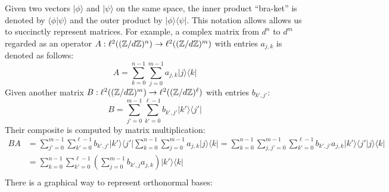 Given two vectors $|\phi \rangle$ and $| \psi \rangle$ on the same space, the inner product ``bra-ket'' is denoted by $\langle \phi | \psi \rangle$ and the outer product by $|\phi \rangle\langle \psi|$. 
This notation allows allows us to succinctly represent matrices.  For example, a complex matrix from $d^n$ to $d^m$ regarded as an operator $A:\ell^2((\mathbb{Z}/d\mathbb{Z})^n)\to \ell^2((\mathbb{Z}/d\mathbb{Z})^m)$ with entries $a_{j,k}$ is denoted as follows:
$$
A  = \sum_{k=0}^{n-1} \sum_{j=0}^{m-1} a_{j,k}| j \rangle \langle k |
$$
Given another matrix $B:\ell^2((\mathbb{Z}/d\mathbb{Z})^m)\to \ell^2((\mathbb{Z}/d\mathbb{Z})^\ell)$ with entries $b_{k',j'}$:
$$
B  = \sum_{j'=0}^{m-1}\sum_{k'=0}^{\ell-1}  b_{k',j'}| k' \rangle \langle j' |
$$
Their composite is computed by matrix multiplication:
\begin{align*}
BA
  &=  \sum_{j'=0}^{m-1}\sum_{k'=0}^{\ell-1}  b_{k',j'}| k' \rangle \langle j' | \sum_{k=0}^{n-1} \sum_{j=0}^{m-1} a_{j,k}| j \rangle \langle k |
= \sum_{k=0}^{n-1} \sum_{j,j'=0}^{m-1}\sum_{k'=0}^{\ell-1}  b_{k',j'}a_{j,k}| k' \rangle \langle j' | j \rangle \langle k |\\
&= \sum_{k=0}^{n-1} \sum_{k'=0}^{\ell-1} \left(\sum_{j=0}^{m-1} b_{k',j}a_{j,k}\right)| k' \rangle \langle k |\\
\end{align*}
There is a graphical way to represent orthonormal bases:
